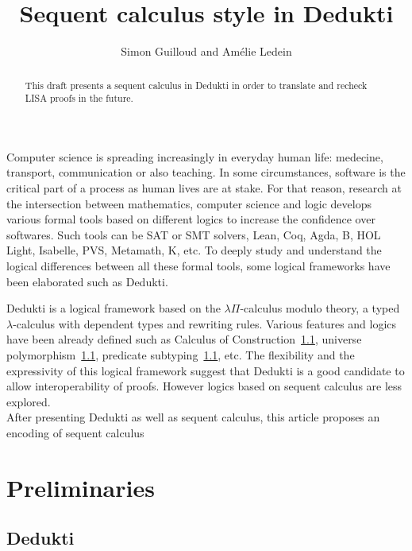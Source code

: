 \documentclass{article}
\title{Sequent calculus style in Dedukti}
\author{Simon Guilloud and Amélie Ledein}
\date{}
\begin{document}
	\maketitle

	\begin{abstract}
		This draft presents a sequent calculus in Dedukti in order to translate and recheck LISA proofs in the future.
	\end{abstract}

	Computer science is spreading increasingly in everyday human life: medecine, transport, communication or also teaching. In some circumstances, software is the critical part of a process as human lives are at stake.
	For that reason, research at the intersection between mathematics, computer science and logic develops various formal tools
	based on different logics to increase the confidence over softwares.
	Such tools can be SAT or SMT solvers, 
	Lean, Coq, Agda, B, HOL Light, Isabelle, PVS, Metamath, K, etc.
	To deeply study and understand the logical differences between all these formal tools, some logical frameworks have been elaborated such as Dedukti.

	Dedukti is a logical framework based on the $\lambda\Pi$-calculus modulo theory, a typed $\lambda$-calculus with dependent types and rewriting rules.
	Various features and logics have been already defined such as Calculus of Construction~\ref{}, universe polymorphism~\ref{}, predicate subtyping~\ref{}, etc.
	The flexibility and the expressivity of this logical framework suggest that Dedukti is a good candidate to allow interoperability of proofs.
	However logics based on sequent calculus are less explored. \\



	After presenting Dedukti as well as sequent calculus, this article proposes an encoding of sequent calculus 

\newpage

	\section{Preliminaries}

	\subsection{Dedukti}
	
\end{document}
